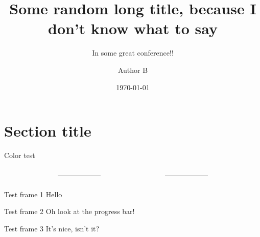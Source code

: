 \documentclass[%
	debug,
	sectionpage,
    listings={
        Lean=listings-lean,
        Go
    },
	withappendix,
	english,
]{rainbow-beamer}
\title[Short title]{Some random long title, because I don't know what to say}
\subtitle{In some great conference!!}
\author[\speaker{A} \and B]{\speaker{Speaker A} \and Author B}
\date{\today}
\begin{document}
\section{Section title}

\begin{frame}{Color test}
	\footnotesize
	\sffamily
	\begin{columns}
		\begin{column}{.27\linewidth}
			\begin{testcolors}[HTML]
			\end{testcolors}
		\end{column}
		\begin{column}{.05\linewidth}
			\centering
			\rule{.1mm}{.7\textheight}
		\end{column}
		\begin{column}{.27\linewidth}
			\begin{testcolors}[HTML]
			\end{testcolors}
		\end{column}
		\begin{column}{.05\linewidth}
			\centering
			\rule{.1mm}{.7\textheight}
		\end{column}
		\begin{column}{.27\linewidth}
			\begin{testcolors}[HTML]
			\end{testcolors}
		\end{column}
	\end{columns}
\end{frame}

\begin{frame}{Test frame 1}
	Hello
\end{frame}

\begin{frame}{Test frame 2}
	Oh look at the progress bar!
\end{frame}

\begin{frame}{Test frame 3}
	It's nice, isn't it?
\end{frame}
\end{document}
